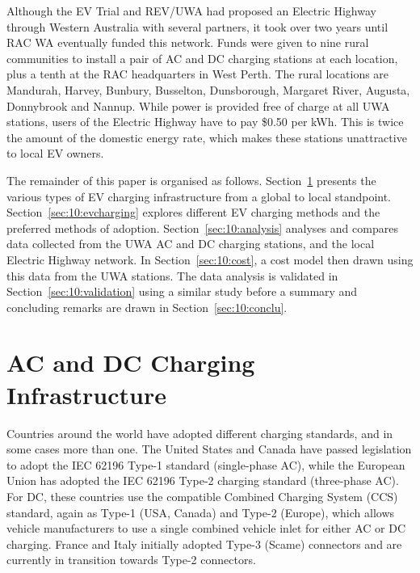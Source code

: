 
Although the EV Trial and REV/UWA had proposed an Electric Highway through Western Australia with several partners, it took over two years until RAC WA eventually funded this network. Funds were given to nine rural communities to install a pair of AC and DC charging stations at each location, plus a tenth at the RAC headquarters in West Perth. The rural locations are Mandurah, Harvey, Bunbury, Busselton, Dunsborough, Margaret River, Augusta, Donnybrook and Nannup. While power is provided free of charge at all UWA stations, users of the Electric Highway have to pay \$0.50 per kWh. This is twice the amount of the domestic energy rate, which makes these stations unattractive to local EV owners.

The remainder of this paper is organised as follows. Section~\ref{sec:10:acdc} presents the various types of EV charging infrastructure from a global to local standpoint. Section~\ref{sec:10:evcharging} explores different EV charging methods and the preferred methods of adoption. Section~\ref{sec:10:analysis} analyses and compares data collected from the UWA AC and DC charging stations, and the local Electric Highway network. In Section~\ref{sec:10:cost}, a cost model then drawn using this data from the UWA stations. The data analysis is validated in Section~\ref{sec:10:validation} using a similar study before a summary and concluding remarks are drawn in Section~\ref{sec:10:conclu}.

\section{AC and DC Charging Infrastructure}
\label{sec:10:acdc}
Countries around the world have adopted different charging standards, and in some cases more than one. The United States and Canada have passed legislation to adopt the IEC 62196 Type-1 standard (single-phase AC), while the European Union has adopted the IEC 62196 Type-2 charging standard (three-phase AC). For DC, these countries use the compatible Combined Charging System (CCS) standard, again as Type-1 (USA, Canada) and Type-2 (Europe), which allows vehicle manufacturers to use a single combined vehicle inlet for either AC or DC charging. France and Italy initially adopted Type-3 (Scame) connectors and are currently in transition towards Type-2 connectors. 

